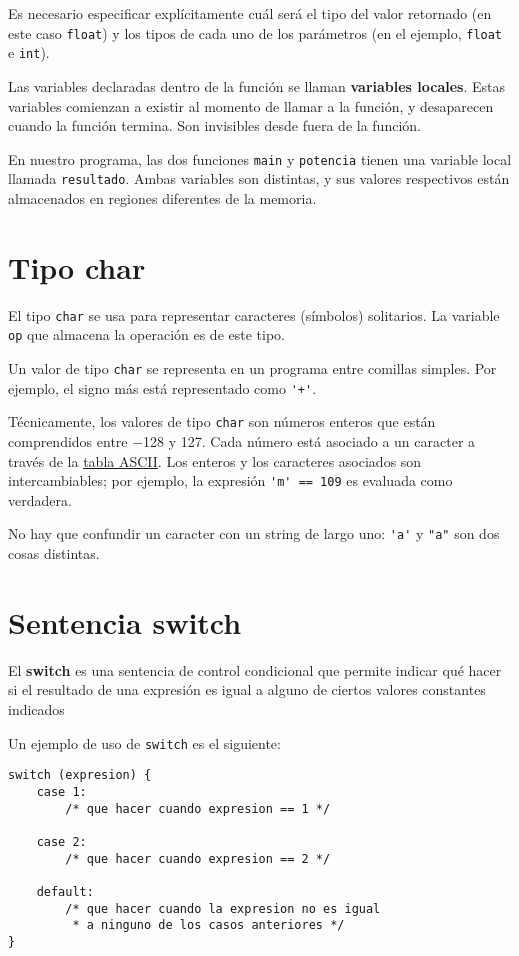 Es necesario especificar explícitamente cuál será el tipo del valor
retornado (en este caso \lstinline!float!) y los tipos de cada uno de
los parámetros (en el ejemplo, \lstinline!float! e \lstinline!int!).

Las variables declaradas dentro de la función se llaman
\textbf{variables locales}. Estas variables comienzan a existir al
momento de llamar a la función, y desaparecen cuando la función termina.
Son invisibles desde fuera de la función.

En nuestro programa, las dos funciones \lstinline!main! y
\lstinline!potencia! tienen una variable local llamada
\lstinline!resultado!. Ambas variables son distintas, y sus valores
respectivos están almacenados en regiones diferentes de la memoria.

\section{Tipo char}

El tipo \lstinline!char! se usa para representar caracteres (símbolos)
solitarios. La variable \lstinline!op! que almacena la operación es de
este tipo.

Un valor de tipo \lstinline!char! se representa en un programa entre
comillas simples. Por ejemplo, el signo más está representado como
\lstinline!'+'!.

Técnicamente, los valores de tipo \lstinline!char! son números enteros
que están comprendidos entre −128 y 127. Cada número está asociado a un
caracter a través de la
\href{http://es.wikipedia.org/wiki/C\%C3\%B3digo\_ASCII\#Caracteres\_imprimibles\_ASCII}{tabla
ASCII}. Los enteros y los caracteres asociados son intercambiables; por
ejemplo, la expresión \lstinline!'m' == 109! es evaluada como verdadera.

No hay que confundir un caracter con un string de largo uno:
\lstinline!'a'! y \lstinline!"a"! son dos cosas distintas.

\section{Sentencia switch}

El \textbf{switch} es una sentencia de control condicional que permite
indicar qué hacer si el resultado de una expresión es igual a alguno de
ciertos valores constantes indicados

Un ejemplo de uso de \lstinline!switch! es el siguiente:

\begin{lstlisting}
switch (expresion) {
    case 1:
        /* que hacer cuando expresion == 1 */

    case 2:
        /* que hacer cuando expresion == 2 */

    default:
        /* que hacer cuando la expresion no es igual
         * a ninguno de los casos anteriores */
}
\end{lstlisting}


